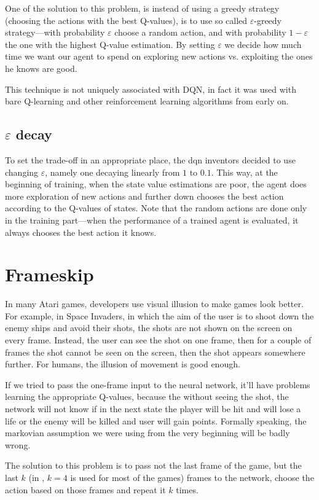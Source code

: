 One of the solution to this problem, is instead of using a greedy strategy (choosing the actions with the best Q-values), is to use so called $\varepsilon$-greedy strategy---with probability $\varepsilon$ choose a random action, and with probability $1 - \varepsilon$ the one with the highest Q-value estimation. By setting $\varepsilon$ we decide how much time we want our agent to spend on exploring new actions vs. exploiting the ones he knows are good.

This technique is not uniquely associated with DQN, in fact it was used with bare Q-learning and other reinforcement learning algorithms from early on.

\subsection{$\varepsilon$ decay}
To set the trade-off in an appropriate place, the dqn inventors decided to use changing $\varepsilon$, namely one decaying linearly from $1$ to $0.1$. This way, at the beginning of training, when the state value estimations are poor, the agent does more exploration of new actions and further down chooses the best action according to the Q-values of states. Note that the random actions are done only in the training part---when the performance of a trained agent is evaluated, it always chooses the best action it knows.

\section{Frameskip}
In many Atari games, developers use visual illusion to make games look better. For example, in Space Invaders, in which the aim of the user is to shoot down the enemy ships and avoid their shots, the shots are not shown on the screen on every frame. Instead, the user can see the shot on one frame, then for a couple of frames the shot cannot be seen on the screen, then the shot appears somewhere further. For humans, the illusion of movement is good enough.

If we tried to pass the one-frame input to the neural network, it'll have problems learning the appropriate Q-values, because the without seeing the shot, the network will not know if in the next state the player will be hit and will lose a life or the enemy will be killed and user will gain points. Formally speaking, the markovian assumption we were using from the very beginning will be badly wrong.

The solution to this problem is to pass not the last frame of the game, but the last $k$ (in \cite{nips-dqn}, $k=4$ is used for most of the games) frames to the network, choose the action based on those frames and repeat it $k$ times.

